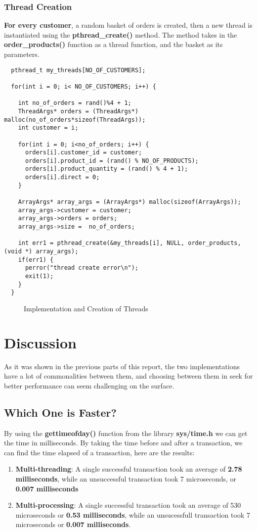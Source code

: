 \documentclass[pdftex,12pt,a4paper]{article}
\begin{document}
\subsubsection{Thread Creation}
\textbf{For every customer}, a random basket of orders is created, then a new thread is instantiated using the \textbf{pthread\_create()} method. The method takes in the \textbf{order\_products()} function as a thread function, and the basket as its parameters.
\begin{lstlisting}
  pthread_t my_threads[NO_OF_CUSTOMERS];

  for(int i = 0; i< NO_OF_CUSTOMERS; i++) {

    int no_of_orders = rand()%4 + 1;
    ThreadArgs* orders = (ThreadArgs*) malloc(no_of_orders*sizeof(ThreadArgs));
    int customer = i;
    
    for(int i = 0; i<no_of_orders; i++) {
      orders[i].customer_id = customer;
      orders[i].product_id = (rand() % NO_OF_PRODUCTS);
      orders[i].product_quantity = (rand() % 4 + 1);
      orders[i].direct = 0;
    }

    ArrayArgs* array_args = (ArrayArgs*) malloc(sizeof(ArrayArgs));
    array_args->customer = customer;
    array_args->orders = orders;
    array_args->size =  no_of_orders;

    int err1 = pthread_create(&my_threads[i], NULL, order_products, (void *) array_args);
    if(err1) {
      perror("thread create error\n");
      exit(1);
    }
  }
\end{lstlisting}
\begin{figure}[H]
\label{fig:thread_implementation}
\caption{Implementation and Creation of Threads}
\end{figure}

\section{Discussion}
As it was shown in the previous parts of this report, the two implementations have a lot of commonalities between them, and choosing between them in seek for better performance can seem challenging on the surface.
\subsection{Which One is Faster?}
By using the \textbf{gettimeofday()} function from the library \textbf{sys/time.h} we can get the time in milliseconds. By taking the time before and after a transaction, we can find the time elapsed of a transaction, here are the results:
\begin{enumerate}
\item \textbf{Multi-threading}: A single successful transaction took an average of \textbf{2.78 milliseconds}, while an unsuccessful transaction took 7 microseconds, or \textbf{0.007 milliseconds}
\item \textbf{Multi-processing}: A single successful transaction took an average of 530 microseconds or \textbf{0.53 milliseconds}, while an unsucessfull transaction took 7 microseconds or \textbf{0.007 milliseconds}.
\end{enumerate}
\end{document}
